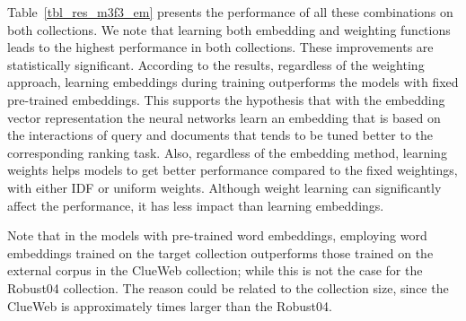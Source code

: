 \documentclass[sigconf]{acmart}
\newcommand{\feedthree}{embedding vector representation\xspace}
\begin{document}
Table~\ref{tbl_res_m3f3_em} presents the performance of all these combinations on both collections. 
We note that learning both embedding and weighting functions leads to the highest performance in both collections. These improvements are statistically significant.
According to the results, regardless of the weighting approach, learning embeddings during training outperforms the models with fixed pre-trained embeddings.
This supports the hypothesis that with the \feedthree the neural networks learn an embedding that is based on the interactions of query and documents that tends to be tuned better to the corresponding ranking task.
Also, regardless of the embedding method, learning weights helps models to get better performance compared to the fixed weightings, with either IDF or uniform weights. 
Although weight learning can significantly affect the performance, it has less impact than learning embeddings.

Note that in the models with pre-trained word embeddings, employing word embeddings trained on the target collection outperforms those trained on the external corpus in the ClueWeb collection; while this is not the case for the Robust04 collection. The reason could be related to the collection size, since the ClueWeb is approximately  times larger than the Robust04.
\end{document}
